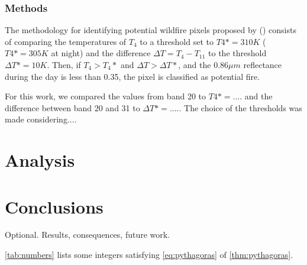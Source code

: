 \documentclass[a4paper, article, oneside, UKenglish]{memoir}
\newcommand{\0}{\mathbf{0}}
\newcommand{\1}{\mathbf{1}}
\begin{document}
\subsection{Methods}

The methodology for identifying potential wildfire pixels proposed by \citeauthor{2018_sweden_wildfires} (\citeyear{giglio_et_al_2016}) consists of comparing the temperatures of $T_4$ to a threshold set to $T4* = 310 K$ ($T4* = 305 K$ at night) and the difference $\Delta T = T_4 - T_{11}$ to the threshold $\Delta T* = 10 K$. Then, if $T_4 > T_4*$ and $\Delta T > \Delta T *$, and the $0.86 \mu m$ reflectance during the day is less than 0.35, the pixel is classified as potential fire. 

For this work, we compared the values from band 20 to $T4* = ....$ and the difference between band 20 and 31 to $\Delta T* = ....$. The choice of the thresholds was made considering....

\chapter{Analysis}

\chapter{Conclusions}


Optional. Results, consequences, future work.

\cref{tab:numbers} lists some integers satisfying \cref{eq:pythagoras} of \cref{thm:pythagoras}.




\printbibliography
\end{document}
